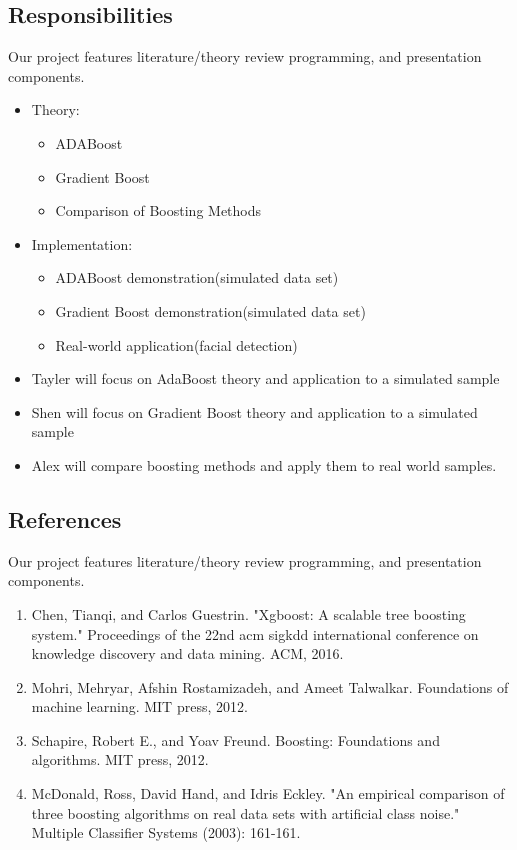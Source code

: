 \documentclass[10pt,twocolumn,letterpaper]{article}
\begin{document}
\subsection{Responsibilities}
Our project features literature/theory review programming, and presentation components. 
\begin{itemize}
	\item Theory:
		\begin{itemize}
			\item ADABoost
			\item Gradient Boost
    			\item Comparison of Boosting Methods
		\end{itemize}
	\item Implementation:
		\begin{itemize}
			\item ADABoost demonstration(simulated data set)
			\item Gradient Boost demonstration(simulated data set)
			\item Real-world application(facial detection)
		\end{itemize}
\end{itemize}
\begin{itemize}
\item    Tayler will focus on AdaBoost theory and application to a simulated sample
\item   Shen will focus on Gradient Boost theory and application to a simulated sample
\item   Alex will compare boosting methods and apply them to real world samples.
\end{itemize}

\subsection{References}
Our project features literature/theory review programming, and presentation components. 
\begin{enumerate}
\item Chen, Tianqi, and Carlos Guestrin. "Xgboost: A scalable tree boosting system." Proceedings of the 22nd acm sigkdd international conference on knowledge discovery and data mining. ACM, 2016.
\item Mohri, Mehryar, Afshin Rostamizadeh, and Ameet Talwalkar. Foundations of machine learning. MIT press, 2012.
\item Schapire, Robert E., and Yoav Freund. Boosting: Foundations and algorithms. MIT press, 2012.
\item McDonald, Ross, David Hand, and Idris Eckley. "An empirical comparison of three boosting algorithms on real data sets with artificial class noise." Multiple Classifier Systems (2003): 161-161.
\end{enumerate}
\end{document}
